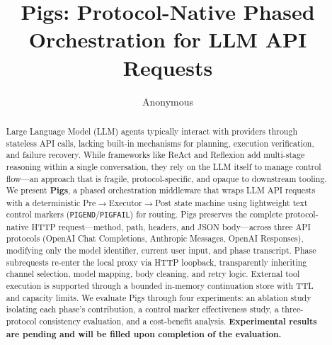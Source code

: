 \documentclass[10pt]{article}
\title{Pigs: Protocol-Native Phased Orchestration for LLM API Requests}
\author{Anonymous}
\date{}
\begin{document}
\maketitle

\begin{abstract}
Large Language Model (LLM) agents typically interact with providers through stateless API calls, lacking built-in mechanisms for planning, execution verification, and failure recovery. While frameworks like ReAct and Reflexion add multi-stage reasoning within a single conversation, they rely on the LLM itself to manage control flow---an approach that is fragile, protocol-specific, and opaque to downstream tooling. We present \textbf{Pigs}, a phased orchestration middleware that wraps LLM API requests with a deterministic Pre$\rightarrow$Executor$\rightarrow$Post state machine using lightweight text control markers (\texttt{PIGEND}/\texttt{PIGFAIL}) for routing. Pigs preserves the complete protocol-native HTTP request---method, path, headers, and JSON body---across three API protocols (OpenAI Chat Completions, Anthropic Messages, OpenAI Responses), modifying only the model identifier, current user input, and phase transcript. Phase subrequests re-enter the local proxy via HTTP loopback, transparently inheriting channel selection, model mapping, body cleaning, and retry logic. External tool execution is supported through a bounded in-memory continuation store with TTL and capacity limits. We evaluate Pigs through four experiments: an ablation study isolating each phase's contribution, a control marker effectiveness study, a three-protocol consistency evaluation, and a cost-benefit analysis. \textbf{Experimental results are pending and will be filled upon completion of the evaluation.}
\end{abstract}











\appendix




\end{document}
